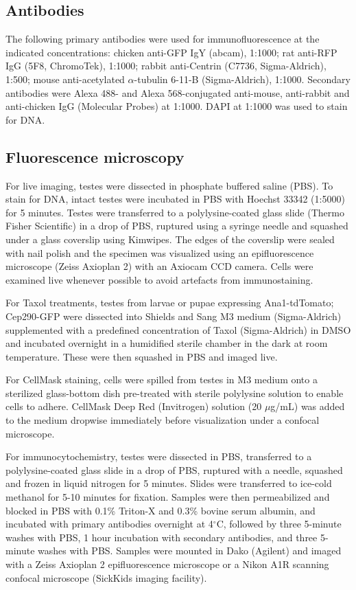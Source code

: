 \documentclass[12pt, twoside, letterpaper]{article}
\begin{document}
\begin{doublespacing}
\begin{linenumbers}
    \subsection*{Antibodies}
    The following primary antibodies were used for immunofluorescence
    at the indicated concentrations: 
    chicken anti-GFP IgY (abcam), 1:1000;
    rat anti-RFP IgG (5F8, ChromoTek), 1:1000;
    rabbit anti-Centrin (C7736, Sigma-Aldrich), 1:500;
    mouse anti-acetylated $\alpha$-tubulin 6-11-B (Sigma-Aldrich), 1:1000.
    Secondary antibodies were Alexa 488- and Alexa 568-conjugated
    anti-mouse, anti-rabbit and anti-chicken
    IgG (Molecular Probes) at 1:1000.
    DAPI at 1:1000 was used to stain for DNA. 

    \subsection*{Fluorescence microscopy}
    For live imaging, testes were dissected in phosphate buffered saline (PBS).
    To stain for DNA, intact testes were incubated in PBS with
    Hoechst 33342 (1:5000) for 5 minutes.
    Testes were transferred to a polylysine-coated glass slide (Thermo Fisher Scientific) in a drop of PBS,
    ruptured using a syringe needle and
    squashed under a glass coverslip using Kimwipes.
    The edges of the coverslip were sealed with nail polish
    and the specimen was visualized using an epifluorescence microscope (Zeiss Axioplan 2)
    with an Axiocam CCD camera.
    Cells were examined live whenever possible to avoid artefacts from immunostaining.

    For Taxol treatments, testes from larvae or pupae expressing
    Ana1-tdTomato; Cep290-GFP were
    dissected into Shields and Sang M3 medium (Sigma-Aldrich) supplemented
    with a predefined
    concentration of Taxol (Sigma-Aldrich) in DMSO
    and incubated overnight in a humidified sterile
    chamber in the dark at room temperature.
    These were then squashed in PBS and imaged live.

    For CellMask staining, cells were spilled from testes in M3 medium onto
    a sterilized glass-bottom dish pre-treated with sterile polylysine solution
    to enable cells to adhere.
    CellMask Deep Red (Invitrogen) solution (20 $\mu$g/mL) was added to the medium dropwise
    immediately before visualization under a confocal microscope.

    For immunocytochemistry, testes were dissected in PBS,
    transferred to a polylysine-coated glass slide in a drop of PBS,
    ruptured with a needle, squashed and frozen in liquid nitrogen for 5 minutes.
    Slides were transferred to ice-cold methanol for 5-10 minutes for fixation.
    Samples were then permeabilized and blocked in PBS with 0.1\% Triton-X and 0.3\% bovine
    serum albumin, and incubated with primary antibodies overnight at 4$^{\circ}$C,
    followed by three 5-minute washes with PBS, 1 hour incubation
    with secondary antibodies, and three 5-minute washes with PBS.
    Samples were mounted in Dako (Agilent) and imaged with
    a Zeiss Axioplan 2 epifluorescence microscope
    or a Nikon A1R scanning confocal microscope (SickKids imaging facility).


\end{linenumbers}
\end{doublespacing}
\end{document}
